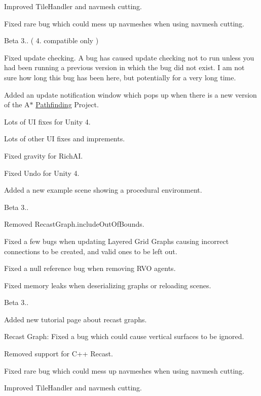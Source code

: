 \begin{DoxyItemize}
\begin{DoxyItemize}
\item Improved Tile\+Handler and navmesh cutting.
\item Fixed rare bug which could mess up navmeshes when using navmesh cutting.
\end{DoxyItemize}
\item Beta 3.. ( 4. compatible only )
\begin{DoxyItemize}
\item Fixed update checking. A bug has caused update checking not to run unless you had been running a previous version in which the bug did not exist. I am not sure how long this bug has been here, but potentially for a very long time.
\item Added an update notification window which pops up when there is a new version of the A$\ast$ \mbox{\hyperlink{namespace_pathfinding}{Pathfinding}} Project.
\item Lots of UI fixes for Unity 4.
\item Lots of other UI fixes and imprements.
\item Fixed gravity for Rich\+AI.
\item Fixed Undo for Unity 4.
\item Added a new example scene showing a procedural environment.
\end{DoxyItemize}
\item Beta 3..
\begin{DoxyItemize}
\item Removed Recast\+Graph.\+include\+Out\+Of\+Bounds.
\item Fixed a few bugs when updating Layered Grid Graphs causing incorrect connections to be created, and valid ones to be left out.
\item Fixed a null reference bug when removing R\+VO agents.
\item Fixed memory leaks when deserializing graphs or reloading scenes.
\end{DoxyItemize}
\item Beta 3..
\begin{DoxyItemize}
\item Added new tutorial page about recast graphs.
\item Recast Graph\+: Fixed a bug which could cause vertical surfaces to be ignored.
\item Removed support for C++ Recast.
\item Fixed rare bug which could mess up navmeshes when using navmesh cutting.
\item Improved Tile\+Handler and navmesh cutting.

\end{DoxyItemize}
\end{DoxyItemize}
